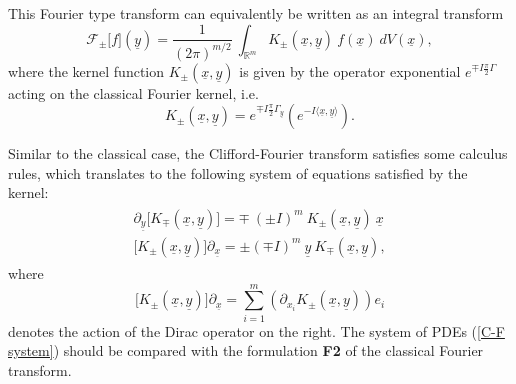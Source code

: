 \documentclass{amsart}
\theoremstyle{remark}
\begin{document}
This Fourier type transform can equivalently be written as an integral transform
\begin{displaymath}
{\mathcal{F}}_{\pm} \lbrack f \rbrack ({\underline{y}}) = \frac{1}{(2 \pi)^{m/2}} \ \int_{\mathbb{R}^m} K_{\pm}({\underline{x}},{\underline{y}}) \ f({\underline{x}}) \ dV({\underline{x}}),
\end{displaymath}
where the kernel function $K_{\pm}({\underline{x}},{\underline{y}})$ is given by the operator exponential $e^{\mp I \frac{\pi}{2} \Gamma}$ acting on the classical Fourier kernel, i.e.
\begin{equation}
\label{Kexpop}
K_{\pm}({\underline{x}},{\underline{y}}) = e^{\mp I \frac{\pi}{2} \Gamma_{\underline{y}}} \left( e^{-I {{\langle}}{\underline{x}},{\underline{y}}{{\rangle}}} \right) .
\end{equation}

Similar to the classical case, the Clifford-Fourier transform satisfies some calculus rules, which translates to the following system of equations satisfied by the kernel:
\begin{align} \label{C-F system}
\begin{split}
\partial_{\underline{y}} \lbrack K_{\mp}({\underline{x}},{\underline{y}}) \rbrack = \mp \ (\pm I)^m \ K_{\pm}({\underline{x}},{\underline{y}}) \ {\underline{x}}\\
\lbrack K_{\pm}({\underline{x}},{\underline{y}}) \rbrack \partial_{\underline{x}} = \pm (\mp I)^m \ {\underline{y}} \ K_{\mp}({\underline{x}},{\underline{y}}),
\end{split}
\end{align}
where 
\[
\lbrack K_{\pm}({\underline{x}},{\underline{y}}) \rbrack \partial_{\underline{x}}  = \sum_{i=1}^{m} \left(\partial_{x_{i}}K_{\pm}({\underline{x}},{\underline{y}}) \right) e_{i}
\]
denotes the action of the Dirac operator on the right. The system of PDEs (\ref{C-F system}) should be compared with the formulation \textbf{F2} of the classical Fourier transform.
\end{document}
